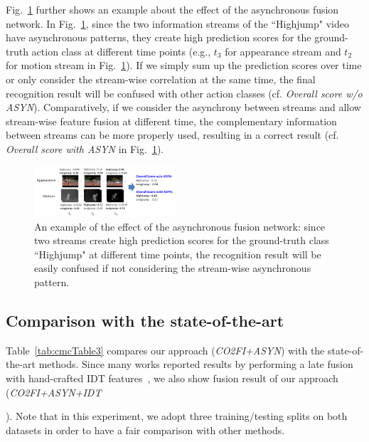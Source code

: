 \documentclass[letterpaper]{article}
\begin{document}
{Fig.~\ref{fig:exp} further shows an example about the effect of the asynchronous fusion network. In Fig.~\ref{fig:exp}, since the two information streams of the ``Highjump" video have asynchronous patterns, they create high prediction scores for the ground-truth action class at different time points (e.g., $t_3$ for appearance stream and $t_2$  for motion stream in Fig.~\ref{fig:exp}). If we simply sum up the prediction scores over time or only consider the stream-wise correlation at the same time, the final recognition result will be confused with other action classes (cf. \emph{Overall score w/o ASYN}). Comparatively, if we consider the asynchrony between streams and allow stream-wise feature fusion at different time, the complementary information between streams can be more properly used, resulting in a correct result (cf. \emph{Overall score with ASYN} in Fig.~\ref{fig:exp}).




\begin{figure}
  \centering
  \includegraphics[width=0.47\textwidth,height=0.18\textwidth]{./figures1/exp.png}
  \caption{An example of the effect of the asynchronous fusion network: since two streams create high prediction scores for the ground-truth class ``Highjump" at different time points, the recognition result will be easily confused if not considering the stream-wise asynchronous pattern.} %
    \label{fig:exp}
\end{figure}




\subsection{Comparison with the state-of-the-art}

Table~\ref{tab:cmcTable3} compares our approach (\emph{CO2FI+ASYN}) with the state-of-the-art methods. Since many works reported results by performing a late fusion with hand-crafted IDT features~\cite{iDT}, we also show fusion result of our approach (\emph{CO2FI+ASYN+IDT}}). Note that in this experiment, we adopt three training/testing splits on both datasets in order to have a fair comparison with other methods.
\end{document}
